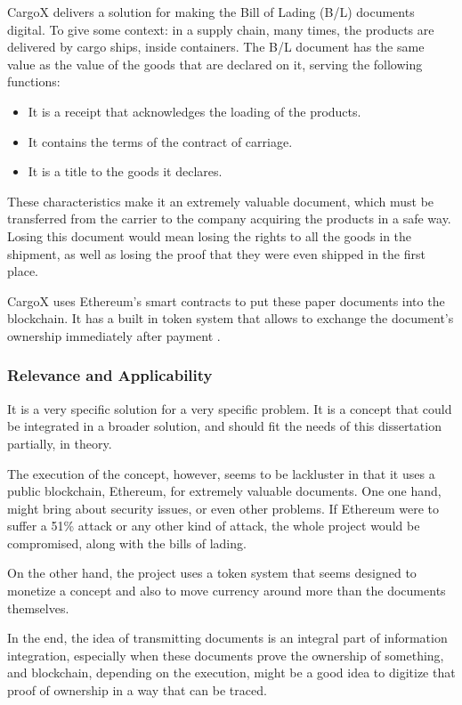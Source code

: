 CargoX delivers a solution for making the Bill of Lading (B/L) documents digital.  To give some context: in a supply chain, many times, the products are delivered by cargo ships, inside containers. The B/L document has the same value as the value of the goods that are declared on it, serving the following functions:
\begin{itemize}
\item It is a receipt that acknowledges the loading of the products.
\item It contains the terms of the contract of carriage.
\item It is a title to the goods it declares.
\end{itemize}
These characteristics make it an extremely valuable document, which must be transferred from the carrier to the company acquiring the products in a safe way. Losing this document would mean losing the rights to all the goods in the shipment, as well as losing the proof that they were even shipped in the first place.

CargoX uses Ethereum's smart contracts to put these paper documents into the blockchain. It has a built in token system that allows to exchange the document's ownership immediately after payment \cite{CargoX2017}.

\subsubsection{Relevance and Applicability}
It is a very specific solution for a very specific problem. It is a concept that could be integrated in a broader solution, and should fit the needs of this dissertation partially, in theory. 

The execution of the concept, however, seems to be lackluster in that it uses a public blockchain, Ethereum, for extremely valuable documents. 
One one hand, might bring about security issues, or even other problems. If Ethereum were to suffer a 51\% attack or any other kind of attack, the whole project would be compromised, along with the bills of lading. 

On the other hand, the project uses a token system that seems designed to monetize a concept and also to move currency around more than the documents themselves.

In the end, the idea of transmitting documents is an integral part of information integration, especially when these documents prove the ownership of something, and blockchain, depending on the execution, might be a good idea to digitize that proof of ownership in a way that can be traced. 

